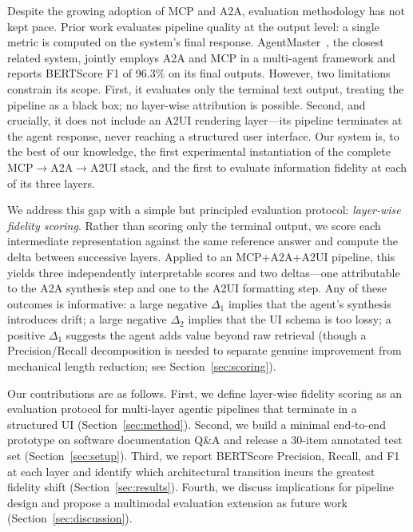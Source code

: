 \documentclass[10pt,journal,compsoc]{IEEEtran}
\begin{document}
Despite the growing adoption of MCP and A2A, evaluation methodology has not kept
pace. Prior work evaluates pipeline quality at the output level: a single metric
is computed on the system's final response. AgentMaster~\cite{liao2025agentmaster},
the closest related system, jointly employs A2A and MCP in a multi-agent framework
and reports BERTScore F1 of 96.3\% on its final outputs. However, two limitations
constrain its scope. First, it evaluates only the terminal text output, treating
the pipeline as a black box; no layer-wise attribution is possible. Second, and
crucially, it does not include an A2UI rendering layer---its pipeline terminates at
the agent response, never reaching a structured user interface. Our system is, to
the best of our knowledge, the first experimental instantiation of the complete
MCP$\rightarrow$A2A$\rightarrow$A2UI stack, and the first to evaluate information
fidelity at each of its three layers.

We address this gap with a simple but principled evaluation protocol:
\emph{layer-wise fidelity scoring}. Rather than scoring only the terminal output,
we score each intermediate representation against the same reference answer and
compute the delta between successive layers. Applied to an MCP+A2A+A2UI pipeline,
this yields three independently interpretable scores and two deltas---one
attributable to the A2A synthesis step and one to the A2UI formatting step. Any of
these outcomes is informative: a large negative $\Delta_1$ implies that the
agent's synthesis introduces drift; a large negative $\Delta_2$ implies that the
UI schema is too lossy; a positive $\Delta_1$ suggests the agent adds value
beyond raw retrieval (though a Precision/Recall decomposition is needed to
separate genuine improvement from mechanical length reduction; see
Section~\ref{sec:scoring}).

Our contributions are as follows. First, we define layer-wise fidelity scoring as
an evaluation protocol for multi-layer agentic pipelines that terminate in a
structured UI (Section~\ref{sec:method}). Second, we build a minimal end-to-end
prototype on software documentation Q\&A and release a 30-item annotated test set
(Section~\ref{sec:setup}). Third, we report BERTScore Precision, Recall, and F1
at each layer and identify which architectural transition incurs the greatest
fidelity shift (Section~\ref{sec:results}). Fourth, we discuss implications for
pipeline design and propose a multimodal evaluation extension as future work
(Section~\ref{sec:discussion}).
\end{document}
